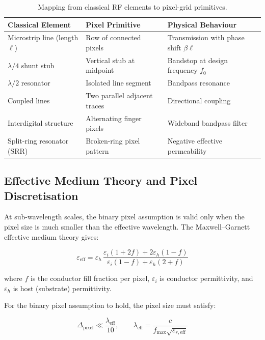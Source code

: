 \documentclass[12pt,a4paper]{article}
\theoremstyle{definition}
\theoremstyle{plain}
\theoremstyle{remark}
\begin{document}
\begin{table}[H]
\centering
\caption{Mapping from classical RF elements to pixel-grid primitives.}
\label{tab:primitives}
\begin{tabular}{lll}
\toprule
\textbf{Classical Element} & \textbf{Pixel Primitive} & \textbf{Physical Behaviour} \\
\midrule
Microstrip line (length $\ell$)   & Row of connected pixels      & Transmission with phase shift $\beta\ell$ \\
$\lambda/4$ shunt stub            & Vertical stub at midpoint    & Bandstop at design frequency $f_0$ \\
$\lambda/2$ resonator             & Isolated line segment        & Bandpass resonance \\
Coupled lines                     & Two parallel adjacent traces & Directional coupling \\
Interdigital structure            & Alternating finger pixels    & Wideband bandpass filter \\
Split-ring resonator (SRR)        & Broken-ring pixel pattern    & Negative effective permeability \\
\bottomrule
\end{tabular}
\end{table}

\subsection{Effective Medium Theory and Pixel Discretisation}
\label{sec:emt}

At sub-wavelength scales, the binary pixel assumption is valid only when the pixel size
is much smaller than the effective wavelength.
The Maxwell--Garnett effective medium theory gives:

\begin{equation}
  \varepsilon_{\mathrm{eff}} =
    \varepsilon_h\,
    \frac{\varepsilon_i(1+2f) + 2\varepsilon_h(1-f)}
         {\varepsilon_i(1-f)  + \varepsilon_h(2+f)}
  \label{eq:maxwell_garnett}
\end{equation}

where $f$ is the conductor fill fraction per pixel, $\varepsilon_i$ is conductor
permittivity, and $\varepsilon_h$ is host (substrate) permittivity.

For the binary pixel assumption to hold, the pixel size must satisfy:

\begin{equation}
  \Delta_{\mathrm{pixel}} \ll \frac{\lambda_{\mathrm{eff}}}{10},
  \qquad
  \lambda_{\mathrm{eff}} = \frac{c}{f_{\max}\sqrt{\varepsilon_{r,\mathrm{eff}}}}
  \label{eq:pixel_validity}
\end{equation}
\end{document}
